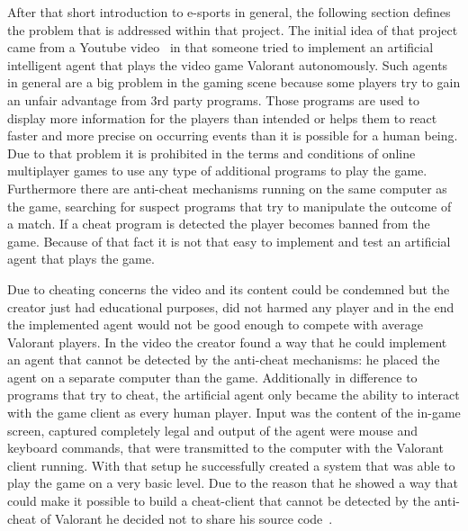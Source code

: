 After that short introduction to e-sports in general, the following section defines the problem that is 
addressed within that project. The initial idea of that project came from a Youtube 
video~\cite{river2021} in that someone tried to implement an artificial intelligent agent that plays the 
video game Valorant autonomously.
Such agents in general are a big problem in the gaming scene because some players try to gain an 
unfair advantage from 3rd party programs. Those programs are used to display more information for 
the players than intended or helps them to react faster and more precise on occurring events than it 
is possible for a human being. Due to that problem it is prohibited in the terms and conditions of 
online multiplayer games to use any type of additional programs to play the game. Furthermore there 
are anti-cheat mechanisms running on the same computer as the game, searching for suspect 
programs that try to manipulate the outcome of a match. If a cheat program is detected the player 
becomes banned from the game. Because of that fact it is not that easy to implement and test an 
artificial agent that plays the game.

Due to cheating concerns the video and its content could be condemned but the creator just had 
educational purposes, did not harmed any player and in the end the implemented agent would not be 
good enough to compete with average Valorant players. In the video the creator found a way that he 
could implement an agent that cannot be detected by the anti-cheat mechanisms: he placed the 
agent on a separate computer than the game. Additionally in difference to programs that try to 
cheat, the artificial agent only became the ability to interact with the game client as every human 
player. Input was the content of the in-game screen, captured completely legal and output of the 
agent were mouse and keyboard commands, that were transmitted to the computer with the 
Valorant client running. With that setup he successfully created a system that was able to play the 
game on a very basic level. Due to the reason that he showed a way that could make it possible to 
build a cheat-client that cannot be detected by the anti-cheat of Valorant he decided not to share 
his source code~\cite{river2021}.

